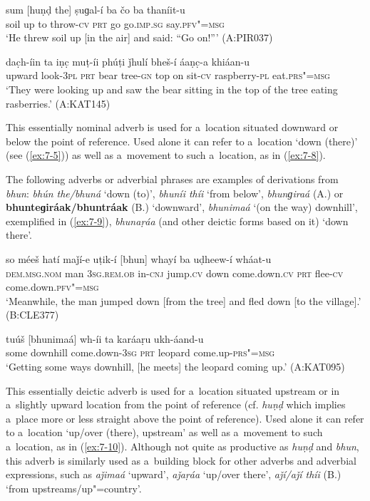 \begin{exe}
\ex
\label{ex:7-6}
\gll sum [huṇḍ the] ṣuɡal-í ba čo ba  thaníit-u \\
soil up to throw-\textsc{cv} \textsc{prt} go go.\textsc{imp.sg} say.\textsc{pfv"=msg} \\
\glt `He threw soil up [in the air] and said: ``Go on!''' (A:PIR037)

\ex
\label{ex:7-7}
\gll [huṇḍɡiraá] dac̣h-íin ta iṇc̣ muṭ-íi phúṭi ǰhulí bheš-í áaṇc̣-a khiáan-u \\
upward  look-\textsc{3pl} \textsc{prt} bear tree-\textsc{gn} top on sit-\textsc{cv} raspberry-\textsc{pl} eat.\textsc{prs"=msg} \\
\glt `They were looking up and saw the bear sitting in the top of the tree eating rasberries.' (A:KAT145)
\end{exe}

 This essentially nominal adverb is used for a~location situated downward or below the point of reference. Used alone it can refer to a~location `down (there)' (see (\ref{ex:7-5})) as well as a~movement to such a~location, as in (\ref{ex:7-8}).


The following adverbs or adverbial phrases are examples of derivations from \textit{bhun}: \textit{bhún the/bhuná} `down (to)', \textit{bhuníi thíi} `from below', \textit{bhunɡiraá} (A.) or \textbf{bhunteɡiráak/bhuntráak} (B.) `downward', \textit{bhunimaá} `(on the way) downhill', exemplified in (\ref{ex:7-9}), \textit{bhunaṛáa} (and other deictic forms based on it) `down there'.

\begin{exe}
\ex
\label{ex:7-8}
\gll so méeš hatí maǰí-e uṭik-í [bhun]  whayí ba uḍheew-í wháat-u\\
\textsc{dem.msg.nom} man \textsc{3sg.rem.ob} in-\textsc{cnj} jump.\textsc{cv} down
come.down.\textsc{cv} \textsc{prt} flee-\textsc{cv} come.down.\textsc{pfv"=msg} \\
\glt `Meanwhile, the man jumped down [from the tree] and fled down [to the village].' (B:CLE377)

\ex
\label{ex:7-9}
\gll tuúš [bhunimaá] wh-íi ta karáaṛu  ukh-áand-u \\
some downhill  come.down-\textsc{3sg} \textsc{prt} leopard come.up-\textsc{prs"=msg} \\
\glt `Getting some ways downhill, [he meets] the leopard coming up.' (A:KAT095)
\end{exe}

 This essentially deictic adverb is used for a~location situated upstream or in a~slightly upward location from the point of reference (cf. \textit{huṇḍ} which implies a~place more or less straight above the point of reference). Used alone it can refer to a~location `up/over (there), upstream' as well as a~movement to such a~location, as in (\ref{ex:7-10}). Although not quite as productive as \textit{huṇḍ} and \textit{bhun}, this adverb is similarly used as a~building block for other adverbs and adverbial expressions, such as \textit{aǰimaá} `upward', \textit{aǰaṛáa} `up/over there', \textit{aǰí/aǰí thíi} (B.) `from upstreams/up"=country'.

